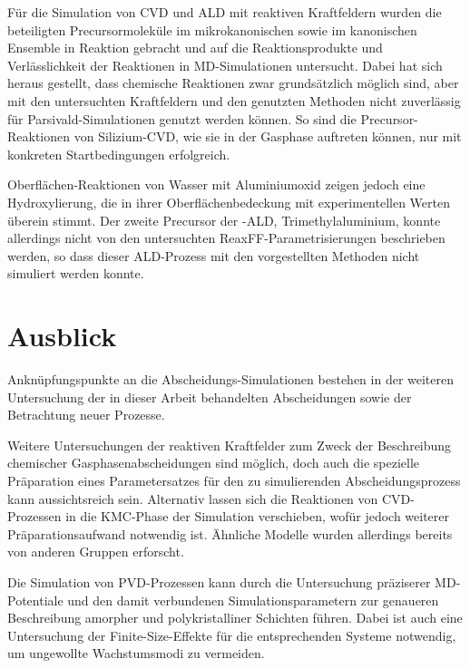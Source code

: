 
Für die Simulation von CVD und ALD mit reaktiven Kraftfeldern wurden die beteiligten Precursormoleküle im mikrokanonischen sowie im kanonischen Ensemble in Reaktion gebracht und auf die Reaktionsprodukte und Verlässlichkeit der Reaktionen in MD-Simulationen untersucht.
Dabei hat sich heraus gestellt, dass chemische Reaktionen zwar grundsätzlich möglich sind, aber mit den untersuchten Kraftfeldern und den genutzten Methoden nicht zuverlässig für Parsivald-Simulationen genutzt werden können.
So sind die Precursor-Reaktionen von Silizium-CVD, wie sie in der Gasphase auftreten können, nur mit konkreten Startbedingungen erfolgreich.

Oberflächen-Reaktionen von Wasser mit Aluminiumoxid zeigen jedoch eine Hydroxylierung, die in ihrer Oberflächenbedeckung mit experimentellen Werten überein stimmt.
Der zweite Precursor der -ALD, Trimethylaluminium, konnte allerdings nicht von den untersuchten ReaxFF-Parametrisierungen beschrieben werden, so dass dieser ALD-Prozess mit den vorgestellten Methoden nicht simuliert werden konnte.

\section{Ausblick}

Anknüpfungspunkte an die Abscheidungs-Simulationen bestehen in der weiteren Untersuchung der in dieser Arbeit behandelten Abscheidungen sowie der Betrachtung neuer Prozesse.

Weitere Untersuchungen der reaktiven Kraftfelder zum Zweck der Beschreibung chemischer Gasphasenabscheidungen sind möglich, doch auch die spezielle Präparation eines Parametersatzes für den zu simulierenden Abscheidungsprozess kann aussichtsreich sein.
Alternativ lassen sich die Reaktionen von CVD-Prozessen in die KMC-Phase der Simulation verschieben, wofür jedoch weiterer Präparationsaufwand notwendig ist.
Ähnliche Modelle wurden allerdings bereits von anderen Gruppen erforscht\cite{stamatakis_graph-theoretical_2011,clark_hybrid_1996}.

Die Simulation von PVD-Prozessen kann durch die Untersuchung präziserer MD-Potentiale und den damit verbundenen Simulationsparametern zur genaueren Beschreibung amorpher und polykristalliner Schichten führen.
Dabei ist auch eine Untersuchung der Finite-Size-Effekte für die entsprechenden Systeme notwendig, um ungewollte Wachstumsmodi zu vermeiden.

